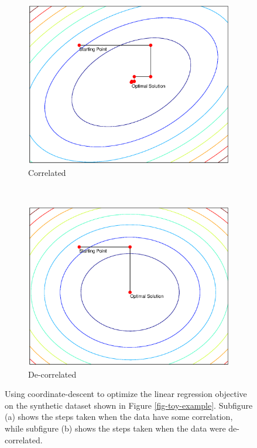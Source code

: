 \documentclass[useAMS,usenatbib,fleqn]{mn2e}
\begin{document}
\begin{figure}
        \centering
        \begin{subfigure}[b]{1\columnwidth}
                 \includegraphics[width=\textwidth]{figures/correlated.eps}
                 \caption{Correlated}
        \end{subfigure}
        ~
        \begin{subfigure}[b]{1\columnwidth}
                 \includegraphics[width=\textwidth]{figures/decorrelated.eps}
                 \caption{De-correlated}
        \end{subfigure}
       \caption{Using coordinate-descent to optimize the linear regression objective on the synthetic dataset shown in Figure \ref{fig-toy-example}. Subfigure (a) shows the steps taken when the data have some correlation, while subfigure (b) shows the steps taken when the data were de-correlated.}
	\label{fig-error-surface}
\end{figure}
\end{document}
